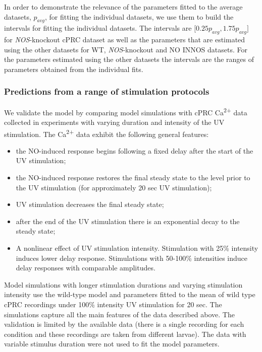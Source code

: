 \documentclass[
  11pt,
  letterpaper,
  DIV=11,
  numbers=noendperiod]{scrartcl}
\providecommand{\tightlist}{%
  \setlength{\itemsep}{0pt}\setlength{\parskip}{0pt}}
\begin{document}
In order to demonstrate the relevance of the parameters fitted to the
average datasets, \(p_{avg}\), for fitting the individual datasets, we
use them to build the intervals for fitting the individual datasets. The
intervals are \({[}0.25p_{avg},1.75p_{avg}{]}\) for \emph{NOS}-knockout
cPRC dataset as well as the parameters that are estimated using the
other datasets for WT, \emph{NOS}-knockout and NO INNOS datasets. For
the parameters estimated using the other datasets the intervals are the
ranges of parameters obtained from the individual fits.

\subsubsection{Predictions from a range of stimulation
protocols}\label{predictions-from-a-range-of-stimulation-protocols}

We validate the model by comparing model simulations with cPRC
Ca\textsuperscript{2+} data collected in experiments with varying
duration and intensity of the UV stimulation. The Ca\textsuperscript{2+}
data exhibit the following general features:

\begin{itemize}
\tightlist
\item
  the NO-induced response begins following a fixed delay after the start
  of the UV stimulation;
\item
  the NO-induced response restores the final steady state to the level
  prior to the UV stimulation (for approximately 20 sec UV stimulation);
\item
  UV stimulation decreases the final steady state;
\item
  after the end of the UV stimulation there is an exponential decay to
  the steady state;
\item
  A nonlinear effect of UV stimulation intensity. Stimulation with 25\%
  intensity induces lower delay response. Stimulations with 50-100\%
  intensities induce delay responses with comparable amplitudes.
\end{itemize}

Model simulations with longer stimulation durations and varying
stimulation intensity use the wild-type model and parameters fitted to
the mean of wild type cPRC recordings under 100\% intensity UV
stimulation for 20 sec. The simulations capture all the main features of
the data described above. The validation is limited by the available
data (there is a single recording for each condition and these
recordings are taken from different larvae). The data with variable
stimulus duration were not used to fit the model parameters.
\end{document}
